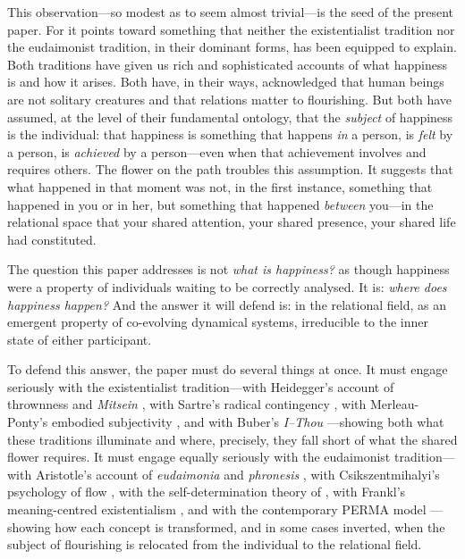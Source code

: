 This observation---so modest as to seem almost trivial---is the seed of the present paper. For it points toward something that neither the existentialist tradition nor the eudaimonist tradition, in their dominant forms, has been equipped to explain. Both traditions have given us rich and sophisticated accounts of what happiness is and how it arises. Both have, in their ways, acknowledged that human beings are not solitary creatures and that relations matter to flourishing. But both have assumed, at the level of their fundamental ontology, that the \emph{subject} of happiness is the individual: that happiness is something that happens \emph{in} a person, is \emph{felt} by a person, is \emph{achieved} by a person---even when that achievement involves and requires others. The flower on the path troubles this assumption. It suggests that what happened in that moment was not, in the first instance, something that happened in you or in her, but something that happened \emph{between} you---in the relational space that your shared attention, your shared presence, your shared life had constituted.

\begin{claim}
The question this paper addresses is not \emph{what is happiness?} as though happiness were a property of individuals waiting to be correctly analysed. It is: \emph{where does happiness happen?} And the answer it will defend is: in the relational field, as an emergent property of co-evolving dynamical systems, irreducible to the inner state of either participant.
\end{claim}

To defend this answer, the paper must do several things at once. It must engage seriously with the existentialist tradition---with Heidegger's account of thrownness and \emph{Mitsein} \parencite{heidegger1962}, with Sartre's radical contingency \parencite{sartre1943}, with Merleau-Ponty's embodied subjectivity \parencite{merleau-ponty1962}, and with Buber's \emph{I--Thou} \parencite{buber1970}---showing both what these traditions illuminate and where, precisely, they fall short of what the shared flower requires. It must engage equally seriously with the eudaimonist tradition---with Aristotle's account of \emph{eudaimonia} and \emph{phronesis} \parencite{aristotle2000}, with Csikszentmihalyi's psychology of flow \parencite{csikszentmihalyi1990}, with the self-determination theory of \textcite{deci1985}, with Frankl's meaning-centred existentialism \parencite{frankl1959}, and with the contemporary PERMA model \parencite{seligman2011}---showing how each concept is transformed, and in some cases inverted, when the subject of flourishing is relocated from the individual to the relational field.

